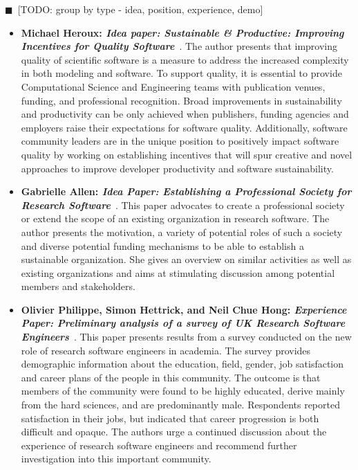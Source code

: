 \documentclass[11pt, oneside]{amsart}
\newcommand{\todo}[1]{{\color{blue}$\blacksquare$~\textsf{[TODO: #1]}}}
\begin{document}
\todo{group by type - idea, position, experience, demo}
\begin{itemize}
\item \textbf{Michael Heroux: \emph{Idea paper: Sustainable \& Productive:
Improving Incentives for Quality Software}}~\cite{Heroux:2016ws}.
The author presents that improving quality of scientific software is a measure
to address the increased complexity in both modeling and software. To support
quality, it is essential to provide Computational Science and Engineering teams
with publication venues, funding, and  professional recognition. Broad
improvements in sustainability and productivity can be only achieved when
publishers, funding agencies and employers raise their expectations for
software quality. Additionally, software community leaders are in the unique
position to positively impact software quality by working on establishing
incentives that will spur creative and novel approaches to improve developer
productivity  and software sustainability.

\item \textbf{Gabrielle Allen: \emph{Idea Paper: Establishing a Professional
Society for Research Software}}~\cite{GAllen:2016ws}.
This paper advocates to create a professional society or extend the scope of an
existing organization in research software. The author presents the motivation,
a variety of potential roles of such a society and diverse potential funding
mechanisms to be able to establish a sustainable organization. She gives an
overview on similar activities as well as existing organizations and aims at
stimulating discussion among potential members and stakeholders.

\item \textbf{Olivier Philippe, Simon Hettrick, and Neil Chue Hong:
\emph{Experience Paper: Preliminary analysis of a survey of UK Research
Software Engineers}}~\cite{Philippe:2016ws}.
This paper presents results from a survey conducted on the new role of research
software engineers in academia. The survey provides demographic information
about the education, field, gender, job satisfaction and career plans of the people
in this community. The outcome is that members of the community  were found to be
highly educated, derive mainly from the hard sciences, and are predominantly male.
Respondents reported satisfaction in their jobs, but indicated that career progression
is both difficult and opaque. The authors urge a continued discussion about the experience
of research software engineers and recommend further investigation into this
important community.


\end{itemize}
\end{document}
